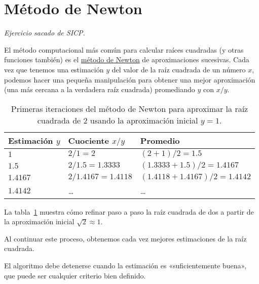 \section{Método de Newton}

\emph{
  Ejercicio sacado de \emph{SICP}\footnotemark.
}

El método computacional más común para calcular raíces cuadradas
(y otras funciones también) es el
\href{http://es.wikipedia.org/wiki/M\%C3\%A9todo\_de\_Newton}{método de Newton}
de aproximaciones sucesivas. Cada vez que tenemos una estimación
\(y\) del valor de la raíz cuadrada de un número \(x\), podemos hacer una
pequeña manipulación para obtener una mejor aproximación (una más
cercana a la verdadera raíz cuadrada) promediando \(y\) con \(x/y\).

\begin{table}
  \centering
  \begin{tabular}{lll}
    \toprule
      Estimación \(y\) & Cuociente \(x/y\)     & Promedio \\
    \midrule
      \(1\)            & \(2/1      = 2\)      & \((2 + 1)          /2 = 1.5\)    \\
      \(1.5\)          & \(2/1.5    = 1.3333\) & \((1.3333 + 1.5 )  /2 = 1.4167\) \\
      \(1.4167\)       & \(2/1.4167 = 1.4118\) & \((1.4118 + 1.4167)/2 = 1.4142\) \\
      \(1.4142\)       & \ldots{}              & \ldots{} \\
    \bottomrule
  \end{tabular}
  \caption{Primeras iteraciones del método de Newton para aproximar la raíz cuadrada de 2
    usando la aproximación inicial \(y = 1\).}
  \label{tbl:iteraciones-newton}
\end{table}

La tabla~\ref{tbl:iteraciones-newton} muestra cómo refinar paso a paso
la raíz cuadrada de dos a partir de la aproximación inicial \(\sqrt{2}\approx 1\).

Al continuar este proceso, obtenemos cada vez mejores estimaciones de la
raíz cuadrada.

El algoritmo debe detenerse cuando la estimación es «suficientemente
buena», que puede ser cualquier criterio bien definido.


